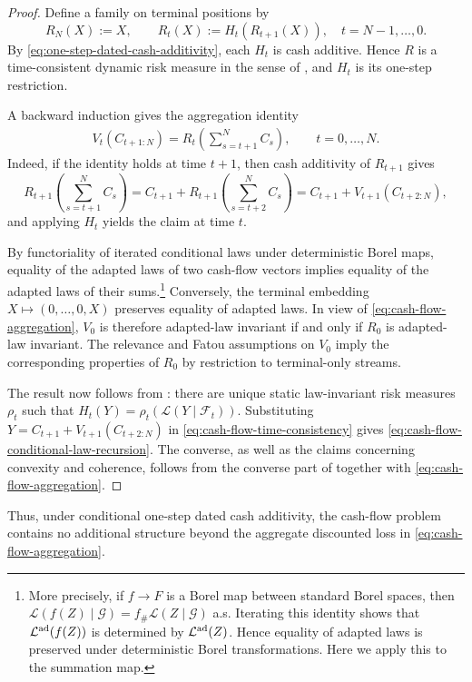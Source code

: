 \documentclass[a4paper]{amsart}
\theoremstyle{definition}
\newcommand{\F}{\mathcal{F}}
\newcommand{\G}{\mathcal{G}}
\newcommand{\law}{\mathcal{L}}
\newcommand{\lawad}{\law^{\textup{ad}}}
\begin{document}
\begin{proof}
Define a family on terminal positions by
\[
R_N(X):=X,
\qquad
R_t(X):=H_t(R_{t+1}(X)),
\quad t=N-1,\dots,0.
\]
By \eqref{eq:one-step-dated-cash-additivity}, each \(H_t\) is cash additive.
Hence \(R\) is a time-consistent dynamic risk measure in the sense of
, and \(H_t\) is its one-step
restriction.

A backward induction gives the aggregation identity
\begin{align}
V_t(C_{t+1:N})
=
R_t\!\left(\sum_{s=t+1}^N C_s\right),
\qquad t=0,\dots,N.
\label{eq:cash-flow-aggregation}
\end{align}
Indeed, if the identity holds at time \(t+1\), then cash additivity of
\(R_{t+1}\) gives
\[
R_{t+1}\!\left(\sum_{s=t+1}^N C_s\right)
=
C_{t+1}
+
R_{t+1}\!\left(\sum_{s=t+2}^N C_s\right)
=
C_{t+1}+V_{t+1}(C_{t+2:N}),
\]
and applying \(H_t\) yields the claim at time \(t\).

By functoriality of iterated conditional laws under deterministic Borel maps,
equality of the adapted laws of two cash-flow vectors implies equality of the
adapted laws of their sums.\footnote{More precisely, if $f\to F$ is a Borel map between standard Borel spaces, then
$\law(f(Z)\mid\G)=f_\#\law(Z\mid\G)$ 
a.s. Iterating this identity shows that
$\lawad(f(Z))$ is determined by $\lawad(Z)$. 
Hence equality of adapted laws
is preserved under deterministic Borel transformations. 
Here we apply this to the summation map.} 
Conversely, the terminal embedding
\(X\mapsto(0,\dots,0,X)\) preserves equality of adapted laws. In view of
\eqref{eq:cash-flow-aggregation}, \(V_0\) is therefore adapted-law invariant
if and only if \(R_0\) is adapted-law invariant. The relevance and Fatou
assumptions on \(V_0\) imply the corresponding properties of \(R_0\) by
restriction to terminal-only streams.

The result now follows from : there are unique
static law-invariant risk measures \(\rho_t\) such that
\(H_t(Y)=\rho_t(\law(Y\mid\F_t))\). Substituting
\(Y=C_{t+1}+V_{t+1}(C_{t+2:N})\) in
\eqref{eq:cash-flow-time-consistency} gives
\eqref{eq:cash-flow-conditional-law-recursion}. The converse, as well as the
claims concerning convexity and coherence, follows from the converse part of
 together with
\eqref{eq:cash-flow-aggregation}.
\end{proof}

Thus, under conditional one-step dated cash additivity, the cash-flow problem
contains no additional structure beyond the aggregate discounted loss in
\eqref{eq:cash-flow-aggregation}.
\end{document}

